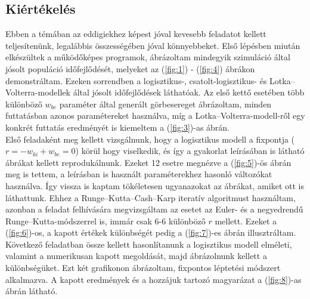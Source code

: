 \begin{multicols}{2}
\section{Kiértékelés} \label{sec:5}
Ebben a témában az eddigiekhez képest jóval kevesebb feladatot kellett teljesítenünk, legalábbis összességében jóval könnyebbeket. Első lépésben miután elkészültek a működőképes programok, ábrázoltam mindegyik szimuláció által jósolt populáció időfejlődését, melyeket az (\ref{fig:1}) - (\ref{fig:4}) ábrákon demonstráltam. Ezeken sorrendben a logisztikus-, csatolt-logisztikus- és Lotka--Volterra-modellek által jósolt időfejlődések láthatóak. Az első kettő esetében több különböző $w_{be}$ paraméter által generált görbesereget ábrázoltam, minden futtatásban azonos paramétereket használva, míg a Lotka--Volterra-modell-ről egy konkrét futtatás eredményét is kiemeltem a (\ref{fig:3})-as ábrán. \\
Első feladaként meg kellett vizsgálnunk, hogy a logisztikus modell a fixpontja ($r = -w_{ki} + w_{be} = 0$) körül hogy viselkedik, és így a gyakorlat leírásában is látható ábrákat kellett reprodukálnunk. Ezeket 12 esetre megnézve a (\ref{fig:5})-ös ábrán meg is tettem, a leírásban is használt paraméterekhez hasonló változókat használva. Így vissza is kaptam tökéletesen ugyanazokat az ábrákat, amiket ott is láthattunk. Ehhez a Runge--Kutta--Cash--Karp iteratív algoritmust használtam, azonban a feladat felhívására megvizsgáltam az esetet az Euler- és a negyedrendű Runge--Kutta-módszerrel is, immár csak 6-6 különböző $r$ mellett. Ezeket a (\ref{fig:6})-os, a kapott értékek különbségét pedig a (\ref{fig:7})-es ábrán illusztráltam. \\
Következő feladatban össze kellett hasonlítanunk a logisztikus modell elméleti, valamint a numerikusan kapott megoldását, majd ábrázolnunk kellett a különbségüket. Ezt két grafikonon ábrázoltam, fixpontos léptetési módszert alkalmazva. A kapott eredmények és a hozzájuk tartozó magyarázat a (\ref{fig:8})-as ábrán látható. \\

\end{multicols}
